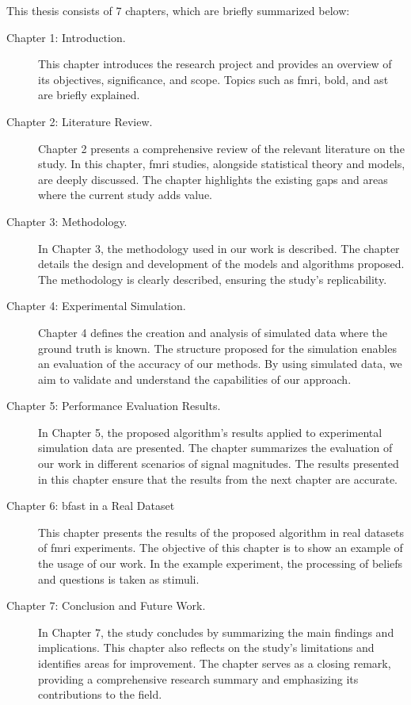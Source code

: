 This thesis consists of 7 chapters, which are briefly summarized below:
\begin{description}
\item [Chapter 1: Introduction.] 
This chapter introduces the research project and provides an overview of its objectives, significance, and scope. Topics such as \gls{fmri}, \gls{bold}, and \gls{ast} are briefly explained.
\item [Chapter 2: Literature Review.]
Chapter 2 presents a comprehensive review of the relevant literature on the study. In this chapter, \gls{fmri} studies, alongside statistical theory and models, are deeply discussed. The chapter highlights the existing gaps and areas where the current study adds value.
\item [Chapter 3: Methodology.]
In Chapter 3, the methodology used in our work is described. The chapter details the design and development of the models and algorithms proposed. The methodology is clearly described, ensuring the study's replicability.
\item [Chapter 4: Experimental Simulation.] 
Chapter 4 defines the creation and analysis of simulated data where the ground truth is known. The structure proposed for the simulation enables an evaluation of the accuracy of our methods. By using simulated data, we aim to validate and understand the capabilities of our approach.
\item [Chapter 5: Performance Evaluation Results.]
In Chapter 5, the proposed algorithm's results applied to experimental simulation data are presented. The chapter summarizes the evaluation of our work in different scenarios of signal magnitudes. The results presented in this chapter ensure that the results from the next chapter are accurate.
\item [Chapter 6: \acrshort{bfast} in a Real Dataset]
This chapter presents the results of the proposed algorithm in real datasets of \gls{fmri} experiments. The objective of this chapter is to show an example of the usage of our work. In the example experiment, the processing of beliefs and questions is taken as stimuli.
\item [Chapter 7: Conclusion and Future Work.]
In Chapter 7, the study concludes by summarizing the main findings and implications. This chapter also reflects on the study's limitations and identifies areas for improvement. The chapter serves as a closing remark, providing a comprehensive research summary and emphasizing its contributions to the field.
\end{description}